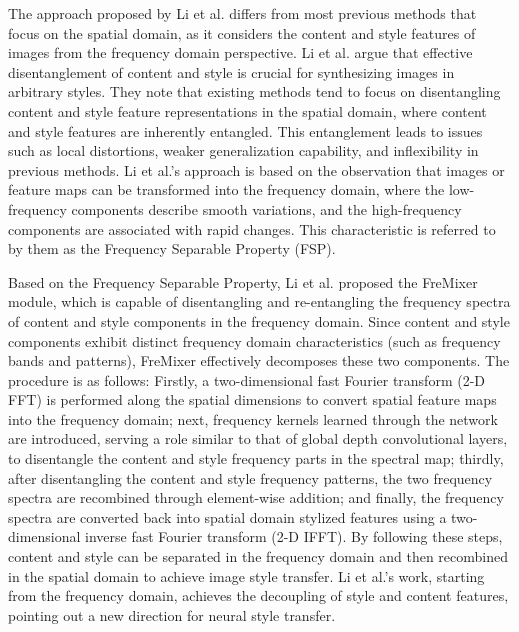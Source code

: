 The approach proposed by Li et al.\citep{03li2023frequency} differs from most previous methods \citep{04huang2017arbitrary,40chen2017stylebank,50li2023compact,55zhu2023all,68zitnick2014adopting,69zhang2017style} that focus on the spatial domain, as it considers the content and style features of images from the frequency domain perspective. Li et al. argue that effective disentanglement of content and style is crucial for synthesizing images in arbitrary styles. They note that existing methods tend to focus on disentangling content and style feature representations in the spatial domain, where content and style features are inherently entangled. This entanglement leads to issues such as local distortions, weaker generalization capability, and inflexibility in previous methods. Li et al.’s approach is based on the observation that images or feature maps can be transformed into the frequency domain, where the low-frequency components describe smooth variations, and the high-frequency components are associated with rapid changes\citep{70chen2019drop}. This characteristic is referred to by them as the Frequency Separable Property (FSP).

Based on the Frequency Separable Property, Li et al. proposed the FreMixer module, which is capable of disentangling and re-entangling the frequency spectra of content and style components in the frequency domain. Since content and style components exhibit distinct frequency domain characteristics (such as frequency bands and patterns), FreMixer effectively decomposes these two components. The procedure is as follows: Firstly, a two-dimensional fast Fourier transform (2-D FFT) is performed along the spatial dimensions to convert spatial feature maps into the frequency domain; next, frequency kernels learned through the network are introduced, serving a role similar to that of global depth convolutional layers, to disentangle the content and style frequency parts in the spectral map; thirdly, after disentangling the content and style frequency patterns, the two frequency spectra are recombined through element-wise addition; and finally, the frequency spectra are converted back into spatial domain stylized features using a two-dimensional inverse fast Fourier transform (2-D IFFT). By following these steps, content and style can be separated in the frequency domain and then recombined in the spatial domain to achieve image style transfer. Li et al.'s work\citep{03li2023frequency}, starting from the frequency domain, achieves the decoupling of style and content features, pointing out a new direction for neural style transfer.


